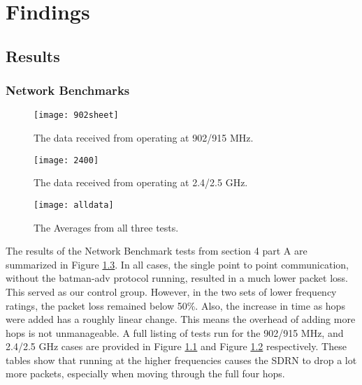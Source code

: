 
\chapter{Findings} %

\label{Chapter4} %




\section{Results}

\subsection{Network Benchmarks}

\begin{figure}
	\centering
	\texttt{[image: 902sheet]}
	\caption{The data received from operating at 902/915 MHz.}
	\label{fig:902}
\end{figure}

\begin{figure}
	\centering
	\texttt{[image: 2400]}
	\caption{The data received from operating at 2.4/2.5 GHz.}
	\label{fig:2400}
\end{figure}

\begin{figure}
	\centering
	\texttt{[image: alldata]}
	\caption{The Averages from all three tests.}
	\label{fig:alldata}
\end{figure}

The results of the Network Benchmark tests from section 4 part A are summarized in Figure \ref{fig:alldata}. In all cases, the single point to point communication, without the batman-adv protocol running, resulted in a much lower packet loss. This served as our control group. However, in the two sets of lower frequency ratings, the packet loss remained below 50\%. Also, the increase in time as hops were added has a roughly linear change. This means the overhead of adding more hops is not unmanageable. A full listing of tests run for the 902/915 MHz, and 2.4/2.5 GHz cases are provided in Figure \ref{fig:902} and Figure \ref{fig:2400} respectively. These tables show that running at the higher frequencies causes the SDRN to drop a lot more packets, especially when moving through the full four hops.  


